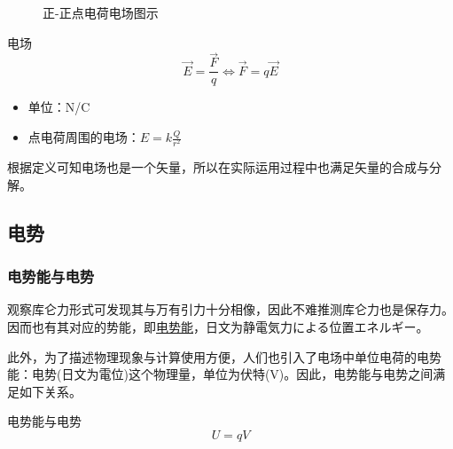\begin{figure}[p!]
    \centering
    \caption{正-正点电荷电场图示}
\end{figure}

\begin{itembox}[l]{电场}
    \begin{equation*}
        \vec{E}=\frac{\vec{F}}{q}
        \iff
        \vec{F}=q\vec{E}
    \end{equation*}
    \begin{itemize}
        \item 单位：N/C
        \item 点电荷周围的电场：$E=k\frac{Q}{r^2}$
    \end{itemize}
\end{itembox}
根据定义可知电场也是一个矢量，所以在实际运用过程中也满足矢量的合成与分解。

\subsection{电势}

\subsubsection{电势能与电势}

观察库仑力形式可发现其与万有引力十分相像，因此不难推测库仑力也是保存力。因而也有其对应的势能，即\underline{电势能}，日文为静電気力による位置エネルギー。

此外，为了描述物理现象与计算使用方便，人们也引入了电场中单位电荷的电势能：电势(日文为電位)这个物理量，单位为伏特(V)。因此，电势能与电势之间满足如下关系。
\begin{itembox}[l]{电势能与电势}
    \begin{equation*}
        U=qV
    \end{equation*}
\end{itembox}

